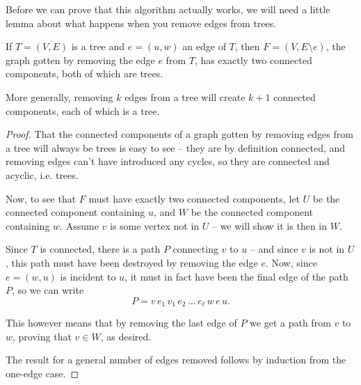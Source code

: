 \documentclass[nobib]{tufte-handout}
\begin{document}
Before we can prove that this algorithm actually works, we will need a little lemma about what happens when you remove edges from trees.

\begin{lemma} \label{lemma:removing_edges_from_trees}
  If $T = (V, E)$ is a tree and $e = (u, w)$ an edge of $T$, then $F = (V, E \setminus e)$, the graph gotten by removing the edge $e$ from $T$, has exactly two connected components, both of which are trees.

  More generally, removing $k$ edges from a tree will create $k+1$ connected components, each of which is a tree.
  
  \begin{proof}
    That the connected components of a graph gotten by removing edges from a tree will always be trees is easy to see -- they are by definition connected, and removing edges can't have introduced any cycles, so they are connected and acyclic, i.e. trees.

    Now, to see that $F$ must have exactly two connected components, let $U$ be the connected component containing $u$, and $W$ be the connected component containing $w$. Assume $v$ is some vertex not in $U$ -- we will show it is then in $W$.

    Since $T$ is connected, there is a path $P$ connecting $v$ to $u$ -- and since $v$ is not in $U$, this path must have been destroyed by removing the edge $e$. Now, since $e = (w, u)$ is incident to $u$, it must in fact have been the final edge of the path $P$, so we can write
    $$P = v\, e_1\, v_1\, e_2\, \ldots\, e_\ell\, w\, e\, u.$$
    
    This however means that by removing the last edge of $P$ we get a path from $v$ to $w$, proving that $v \in W$, as desired.

    The result for a general number of edges removed follows by induction from the one-edge case.
  \end{proof}
\end{lemma}
\end{document}
